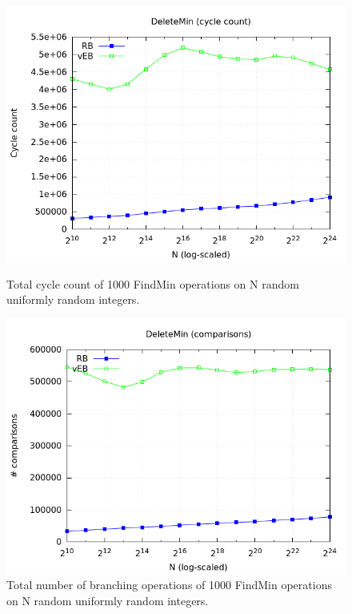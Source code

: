 \documentclass[a4paper,oneside,article,11pt]{memoir}
\begin{document}
\begin{figure}[H]
\centering
\begin{minipage}{0.48\columnwidth}
  \centering
  \includegraphics[width=\linewidth]{../res/rbveb/rbveb_deletemin_cyc.png}%
  \caption{Total cycle count of 1000 FindMin operations on N random uniformly random integers.}
  \label{fig:rbveb_deletemin_cyc}
\end{minipage}%
\hfill
\begin{minipage}{0.48\columnwidth}
  \centering
  \includegraphics[width=\linewidth]{../res/rbveb/rbveb_deletemin_br.png}%
  \caption{Total number of branching operations of 1000 FindMin operations on N random uniformly random integers.}
  \label{fig:rbveb_deletemin_br}
\end{minipage}
\end{figure}
\end{document}
